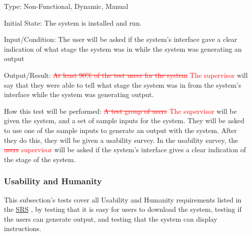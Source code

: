 \documentclass[12pt, titlepage]{article}
\begin{document}
\begin{enumerate}
Type: Non-Functional, Dynamic, Manual
					
Initial State: 
The system is installed and run.		

Input/Condition: 
The user will be asked if the system's interface gave a clear indication of what stage the system was in while the system was generating an output

Output/Result: 
\textcolor{red}{\sout{At least 90\% of the test users for the system} The supervisor} will say that they were able to tell what stage the system was in from the system's interface while the system was generating output.
					
How this test will be performed:
\textcolor{red}{\sout{A test group of users} The supervisor} will be given the system, and a set of sample inputs for the system. They will be asked to use one of the sample inputs to generate an output with the system. After they do this, they will be given a usability survey. In the usability survey, the \textcolor{red}{\sout{users} supervisor} will be asked if the system's interface gives a clear indication of the stage of the system.

\end{enumerate}

\subsubsection{Usability and Humanity}
This subsection's tests cover all Usability and Humanity requirements listed in the \href{https://github.com/paezha/PyERT-BLACK/blob/main/docs/SRS/SRS.pdf}{SRS} \citep{SRS}, by testing that it is easy for users to download the system, testing if the users can generate output, and testing that the system can display instructions. 
\end{document}
